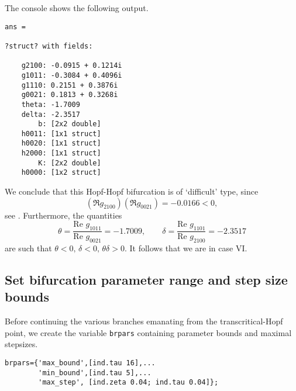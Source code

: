 The \MATLAB console shows the following output.
\begin{lstlisting}[style=matlabConsole,keepspaces=true]
ans = 

?struct? with fields:

    g2100: -0.0915 + 0.1214i
    g1011: -0.3084 + 0.4096i
    g1110: 0.2151 + 0.3876i
    g0021: 0.1813 + 0.3268i
    theta: -1.7009
    delta: -2.3517
        b: [2x2 double]
    h0011: [1x1 struct]
    h0020: [1x1 struct]
    h2000: [1x1 struct]
        K: [2x2 double]
    h0000: [1x2 struct]
\end{lstlisting}
We conclude that this Hopf-Hopf bifurcation is of `difficult' type, since
\[
( \Re g_{2100} )( \Re g_{0021} ) = -0.0166 < 0,
\]
see \cite{Kuznetsov2004}. Furthermore, the quantities
\[
\theta=\frac{\text{Re }g_{1011}}{\text{Re }g_{0021}}=-1.7009,\qquad\delta=\frac{\text{Re }g_{1101}}{\text{Re }g_{2100}}=-2.3517
\]
are such that $\theta<0,\,\delta<0,\,\theta\delta>0$. It follows that we are in case VI.

\subsection{Set bifurcation parameter range and step size bounds}
Before continuing the various branches emanating from the transcritical-Hopf point, we create the variable \lstinline|brpars| containing parameter bounds and maximal stepsizes.
\begin{lstlisting}[style=customMatlab]
%% Set bifurcation parameter range and step size bounds
brpars={'max_bound',[ind.tau 16],...
        'min_bound',[ind.tau 5],...
        'max_step', [ind.zeta 0.04; ind.tau 0.04]};
\end{lstlisting}

